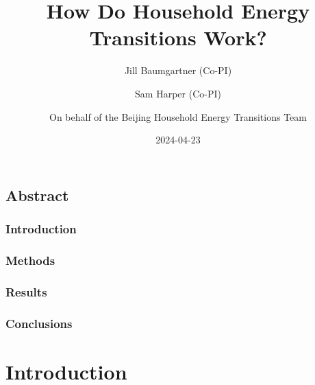 \documentclass[
  letterpaper,
  DIV=11,
  numbers=noendperiod]{scrartcl}
\title{How Do Household Energy Transitions Work?}
\author{Jill Baumgartner (Co-PI) \and Sam Harper (Co-PI) \and On behalf
of the Beijing Household Energy Transitions Team}
\date{2024-04-23}
\renewcommand*\contentsname{Table of contents}
\newcommand\contentsname{Table of contents}
\begin{document}
\maketitle
\ifdefined\Shaded\renewenvironment{Shaded}{\begin{tcolorbox}[frame hidden, boxrule=0pt, sharp corners, breakable, borderline west={3pt}{0pt}{shadecolor}, enhanced, interior hidden]}{\end{tcolorbox}}\fi

\renewcommand*\contentsname{Table of contents}
{
\hypersetup{linkcolor=}
\setcounter{tocdepth}{3}
\tableofcontents
}
\hypertarget{abstract}{%
\subsection*{Abstract}\label{abstract}}

\hypertarget{introduction}{%
\subsubsection*{Introduction}\label{introduction}}

\hypertarget{methods}{%
\subsubsection*{Methods}\label{methods}}

\hypertarget{results}{%
\subsubsection*{Results}\label{results}}

\hypertarget{conclusions}{%
\subsubsection*{Conclusions}\label{conclusions}}

\hypertarget{introduction-1}{%
\section{Introduction}\label{introduction-1}}
\end{document}

